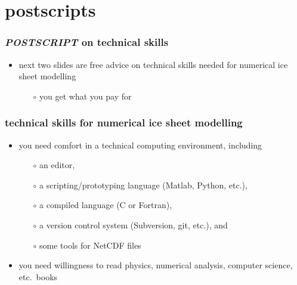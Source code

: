 
\section{postscripts}

\begin{frame}[fragile]
\frametitle{\textsl{POSTSCRIPT} on technical skills}

\begin{itemize}
\item next two slides are free advice on technical skills needed for numerical ice sheet modelling
  \begin{itemize}\small
  \item[$\circ$] you get what you pay for
  \normalsize
  \end{itemize}
\end{itemize}
\end{frame}


\begin{frame}
\frametitle{technical skills for numerical ice sheet modelling }

\begin{itemize}
\item you need comfort in a technical computing environment, including
  \begin{itemize}\small
  \item[$\circ$] an editor,
  \item[$\circ$] a scripting/prototyping language (Matlab, Python, etc.),
  \item[$\circ$] a compiled language (C or Fortran),
  \item[$\circ$] a version control system (Subversion, git, etc.), and
  \item[$\circ$] some tools for NetCDF files
  \normalsize
  \end{itemize}
\item you need willingness to read physics, numerical analysis, computer science, etc.~books
\end{itemize}
\end{frame}


